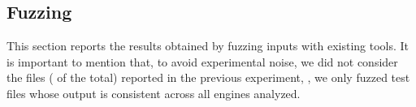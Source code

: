 \documentclass[10pt,conference,anonymous]{IEEEtran}
\begin{document}



\subsection{Fuzzing}

This section reports the results obtained by fuzzing inputs with
existing tools. It is important to mention that, to avoid experimental
noise, we did not consider the \nofuzzTotalFiles{} files ( of the
total) reported in the previous experiment, \ie{}, we only fuzzed test
files whose output is consistent across all engines analyzed.

\end{document}
